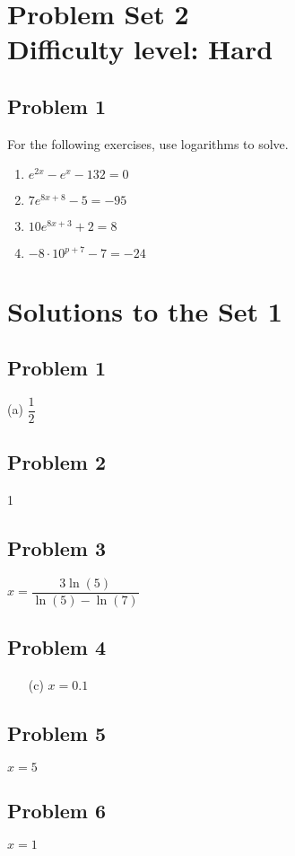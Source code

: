 \documentclass[12pt]{article}
\begin{document}
\section*{Problem Set 2\\Difficulty level: Hard}
\subsection*{Problem 1}
For the following exercises, use logarithms to solve.
\begin{enumerate}[label=(\alph*)]
    \item \( e^{2x} - e^x - 132 = 0 \)
    \item \( 7e^{8x+8} - 5 = -95 \)
    \item \( 10e^{8x+3} + 2 = 8 \)
    \item \(-8 \cdot 10^{p+7}-7=-24\)
\end{enumerate}


\newpage
\section*{Solutions to the Set 1}

\subsection*{Problem 1}
(a) \( \dfrac{1}{2} \)

\subsection*{Problem 2}
1

\subsection*{Problem 3}
\(x=\dfrac{3\ln(5)}{\ln(5)-\ln(7)}\)

\subsection*{Problem 4}
\begin{enumerate}
    \item[(c)] \(x=0.1\)
\end{enumerate} 

\subsection*{Problem 5}
\( x = 5 \)

\subsection*{Problem 6}
\( x = 1 \)
\end{document}
